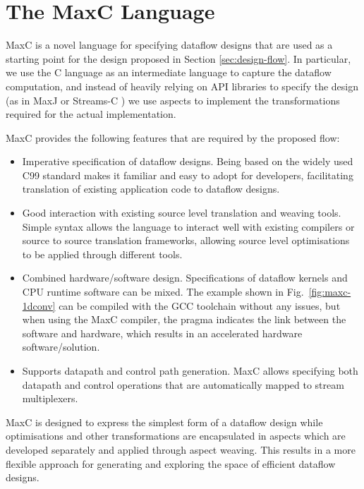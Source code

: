 \section{The  MaxC Language}
\label{sec:maxc}

MaxC is a novel language for specifying dataflow designs that are used
as a starting point for the design proposed in Section
\ref{sec:design-flow}. In particular, we use
the C language as an intermediate language to capture the dataflow computation, and instead
of heavily relying on API libraries to specify the design (as in MaxJ
\cite{MaxelerTechnologies:2012} or Streams-C
\cite{Gokhale:Stone:Arnold:Kalinowski:2000}) we use aspects to
implement the transformations required for the actual implementation.

MaxC provides the following features that are
required by the proposed flow:

\begin{itemize}
\item Imperative specification of dataflow designs. Being based on the
  widely used C99 standard makes it familiar and easy to adopt for
  developers, facilitating translation of existing application code to
  dataflow designs.
\item Good interaction with existing source level translation and
  weaving tools. Simple syntax allows the language to interact well
  with existing compilers or source to source translation frameworks,
  allowing source level optimisations to be applied through different
  tools.
\item Combined hardware/software design. Specifications of dataflow
  kernels and CPU runtime software can be mixed. The example shown in
  Fig.~\ref{fig:maxc-1dconv} can be compiled with the GCC toolchain
  without any issues, but when using the MaxC compiler, the pragma
  indicates the link between the software and hardware, which results
  in an accelerated hardware software/solution.
\item Supports datapath and control path generation. MaxC allows
  specifying both datapath and control operations that are
  automatically mapped to stream multiplexers.
\end{itemize}

MaxC is designed to express the simplest form of a dataflow design
while optimisations and other transformations are encapsulated in
aspects which are developed separately and applied through aspect
weaving. This results in a more flexible approach for generating and
exploring the space of efficient dataflow designs.

